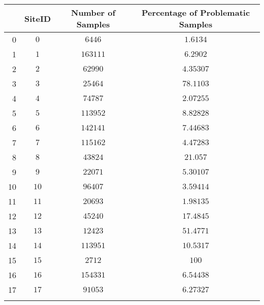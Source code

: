 \begin{table}[htp]
	\begin{tabular}{rccc}
	\toprule
		\begin{small}
			{} & {SiteID} & {Number of Samples} & {Percentage of Problematic Samples}\\
			\midrule
			{0} & $0$ & $6446$ & $1.6134$\\
			{1} & $1$ & $163111$ & $6.2902$\\
			{2} & $2$ & $62990$ & $4.35307$\\
			{3} & $3$ & $25464$ & $78.1103$\\
			{4} & $4$ & $74787$ & $2.07255$\\
			{5} & $5$ & $113952$ & $8.82828$\\
			{6} & $6$ & $142141$ & $7.44683$\\
			{7} & $7$ & $115162$ & $4.47283$\\
			{8} & $8$ & $43824$ & $21.057$\\
			{9} & $9$ & $22071$ & $5.30107$\\
			{10} & $10$ & $96407$ & $3.59414$\\
			{11} & $11$ & $20693$ & $1.98135$\\
			{12} & $12$ & $45240$ & $17.4845$\\
			{13} & $13$ & $12423$ & $51.4771$\\
			{14} & $14$ & $113951$ & $10.5317$\\
			{15} & $15$ & $2712$ & $100$\\
			{16} & $16$ & $154331$ & $6.54438$\\
			{17} & $17$ & $91053$ & $6.27327$\\
		\end{small}
	\bottomrule
	\end{tabular}
\end{table}